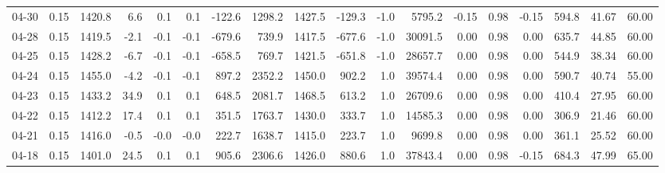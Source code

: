 \begin{threeparttable}
{\begin{tabular}{lrrrrrrrrrrrrrrrrr}
  04-30 &     0.15 & 1420.8 &               6.6 &               0.1 &                0.1 &             -122.6 &  1298.2 & 1427.5 &     -129.3 &                     -1.0 &              5795.2 &      -0.15 &      0.98 &          -0.15 &            594.8 &           41.67 &                  60.00 \\
  04-28 &     0.15 & 1419.5 &              -2.1 &              -0.1 &               -0.1 &             -679.6 &   739.9 & 1417.5 &     -677.6 &                     -1.0 &             30091.5 &       0.00 &      0.98 &           0.00 &            635.7 &           44.85 &                  60.00 \\
  04-25 &     0.15 & 1428.2 &              -6.7 &              -0.1 &               -0.1 &             -658.5 &   769.7 & 1421.5 &     -651.8 &                     -1.0 &             28657.7 &       0.00 &      0.98 &           0.00 &            544.9 &           38.34 &                  60.00 \\
  04-24 &     0.15 & 1455.0 &              -4.2 &              -0.1 &               -0.1 &              897.2 &  2352.2 & 1450.0 &      902.2 &                      1.0 &             39574.4 &       0.00 &      0.98 &           0.00 &            590.7 &           40.74 &                  55.00 \\
  04-23 &     0.15 & 1433.2 &              34.9 &               0.1 &                0.1 &              648.5 &  2081.7 & 1468.5 &      613.2 &                      1.0 &             26709.6 &       0.00 &      0.98 &           0.00 &            410.4 &           27.95 &                  60.00 \\
  04-22 &     0.15 & 1412.2 &              17.4 &               0.1 &                0.1 &              351.5 &  1763.7 & 1430.0 &      333.7 &                      1.0 &             14585.3 &       0.00 &      0.98 &           0.00 &            306.9 &           21.46 &                  60.00 \\
  04-21 &     0.15 & 1416.0 &              -0.5 &              -0.0 &               -0.0 &              222.7 &  1638.7 & 1415.0 &      223.7 &                      1.0 &              9699.8 &       0.00 &      0.98 &           0.00 &            361.1 &           25.52 &                  60.00 \\
  04-18 &     0.15 & 1401.0 &              24.5 &               0.1 &                0.1 &              905.6 &  2306.6 & 1426.0 &      880.6 &                      1.0 &             37843.4 &       0.00 &      0.98 &          -0.15 &            684.3 &           47.99 &                  65.00 \\

\end{tabular}}
\end{threeparttable}

